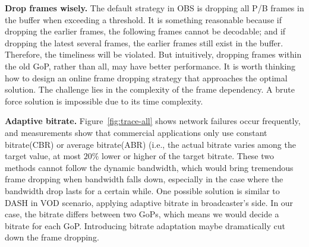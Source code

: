 \textbf{Drop frames wisely.} The default strategy in OBS is dropping all P/B frames in the buffer when exceeding a threshold. It is something reasonable because if dropping the earlier frames, the following frames cannot be decodable; and if dropping the latest several frames, the earlier frames still exist in the buffer. Therefore, the timeliness will be violated. But intuitively, dropping frames within the old GoP, rather than all, may have better performance. It is worth thinking how to design an online frame dropping strategy that approaches the optimal solution. The challenge lies in the complexity of the frame dependency. A brute force solution is impossible due to its time complexity.

\textbf{Adaptive bitrate.} Figure~\ref{fig:trace-all} shows network failures occur frequently, and measurements show that commercial applications only use constant bitrate(CBR) or average bitrate(ABR) (i.e., the actual bitrate varies among the target value, at most $20\%$ lower or higher of the target bitrate. These two methods cannot follow the dynamic bandwidth, which would bring tremendous frame dropping when bandwidth falls down, especially in the case where the bandwidth drop lasts for a certain while. One possible solution is similar to DASH in VOD scenario, applying adaptive bitrate in broadcaster's side. In our case, the bitrate differs between two GoPs, which means we would decide a bitrate for each GoP. Introducing bitrate adaptation maybe dramatically cut down the frame dropping.

